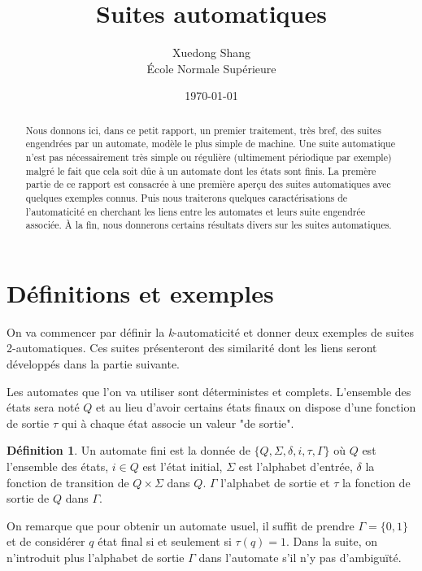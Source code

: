 \documentclass[12pt]{article}
\title{Suites automatiques}
\author{Xuedong Shang\\\'Ecole Normale Sup\'erieure}
\date\today
\theoremstyle{plain}
\theoremstyle{definition}
\newtheorem{definition}[theoreme]{D\'efinition}
\theoremstyle{remark}
\begin{document}
\maketitle

\tableofcontents

\begin{abstract}
Nous donnons ici, dans ce petit rapport, un premier traitement, tr\`es bref, des suites engendr\'ees par un automate, mod\`ele le plus simple de machine. Une suite automatique n'est pas n\'ecessairement tr\`es simple ou r\'eguli\`ere (ultimement p\'eriodique par exemple) malgr\'e le fait que cela soit d\^ue \`a un automate dont les \'etats sont finis. La prem\`ere partie de ce rapport est consacr\'ee \`a une premi\`ere aper\c cu des suites automatiques avec quelques exemples connus. Puis nous traiterons quelques caract\'erisations de l'automaticit\'e en cherchant les liens entre les automates et leurs suite engendr\'ee associ\'ee. \`A la fin, nous donnerons certains r\'esultats divers sur les suites automatiques.
\end{abstract}

\section{D\'efinitions et exemples}
On va commencer par d\'efinir la \textit{k}-automaticit\'e et donner deux exemples de suites 2-automatiques. Ces suites pr\'esenteront des similarit\'e dont les liens seront d\'evelopp\'es dans la partie suivante.

Les automates que l'on va utiliser sont d\'eterministes et complets. L'ensemble des \'etats sera not\'e $Q$ et au lieu d'avoir certains \'etats finaux on dispose d'une fonction de sortie $\tau$ qui \`a chaque \'etat associe un valeur "de sortie".

\begin{definition}
  Un automate fini est la donn\'ee de $\{Q,\Sigma,\delta,i,\tau,\Gamma\}$ o\`u $Q$ est l'ensemble des \'etats,
  $i\in{Q}$ est l'\'etat initial, $\Sigma$ est l'alphabet d'entr\'ee, $\delta$ la fonction de transition de
  $Q\times\Sigma$ dans $Q$. $\Gamma$ l'alphabet de sortie et $\tau$ la fonction de sortie de $Q$ dans  $\Gamma$.
\end{definition}

On remarque que pour obtenir un automate usuel, il suffit de prendre $\Gamma=\{0,1\}$ et de consid\'erer $q$ \'etat final si et seulement si $\tau(q)=1$. Dans la suite, on n'introduit plus l'alphabet de sortie $\Gamma$ dans l'automate s'il n'y pas d'ambigu\"it\'e.
\end{document}
